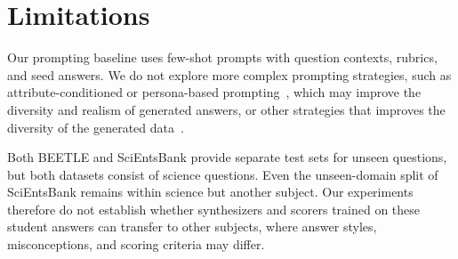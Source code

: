 \documentclass[11pt]{article}
\begin{document}
\section*{Limitations}
Our prompting baseline uses few-shot prompts with question contexts, rubrics, and seed answers. We do not explore more complex prompting strategies, such as attribute-conditioned or persona-based prompting~\citep{liuPersonalityawareStudentSimulation2025}, which may improve the diversity and realism of generated answers, or other strategies that improves the diversity of the generated data~\citep{ceginEffectsDiversityIncentives2024}.

Both BEETLE and SciEntsBank provide separate test sets for unseen questions, but both datasets consist of science questions. Even the unseen-domain split of SciEntsBank remains within science but another subject. Our experiments therefore do not establish whether synthesizers and scorers trained on these student answers can transfer to other subjects, where answer styles, misconceptions, and scoring criteria may differ.

%



\appendix


\end{document}

